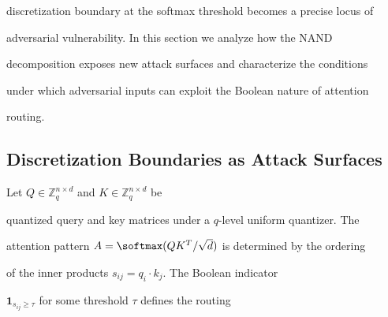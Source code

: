 discretization boundary at the softmax threshold becomes a precise locus of






adversarial vulnerability.  In this section we analyze how the NAND






decomposition exposes new attack surfaces and characterize the conditions






under which adversarial inputs can exploit the Boolean nature of attention






routing.













\subsection{Discretization Boundaries as Attack Surfaces}













Let $Q \in \mathbb{Z}_q^{n \times d}$ and $K \in \mathbb{Z}_q^{n \times d}$ be






quantized query and key matrices under a $q$-level uniform quantizer.  The






attention pattern $A = \softmax(QK^T / \sqrt{d})$ is determined by the ordering






of the inner products $s_{ij} = q_i \cdot k_j$.  The Boolean indicator






$\mathbf{1}_{s_{ij} \geq \tau}$ for some threshold $\tau$ defines the routing






